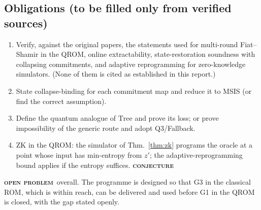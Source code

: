 \documentclass[11pt]{article}
\newcommand{\epitag}[3]{\colorbox{#2}{\textcolor{#1}{\textsc{\footnotesize\bfseries #3}}}}
\newcommand{\conjectureTag}{\epitag{conjyellow}{conjbg}{conjecture}}
\newcommand{\openproblem}{\epitag{openred}{openbg}{open problem}}
\renewcommand{\_}{\textunderscore\allowbreak{}}
\theoremstyle{definition}
\begin{document}
\subsection{Obligations (to be filled only from verified sources)}
\begin{enumerate}[leftmargin=1.6em,label=\textbf{Q\arabic*.}]
\item Verify, against the original papers, the statements used for multi-round Fiat--Shamir in the QROM, online extractability, state-restoration soundness with collapsing commitments, and adaptive reprogramming for zero-knowledge simulators. (None of them is cited as established in this report.)
\item State collapse-binding for each commitment map and reduce it to MSIS (or find the correct assumption).
\item Define the quantum analogue of $\mathrm{Tree}$ and prove its loss; or prove impossibility of the generic route and adopt Q3/Fallback.
\item ZK in the QROM: the simulator of Thm.~\ref{thm:zk} programs the oracle at a point whose input has min-entropy from $z'$; the adaptive-reprogramming bound applies if the entropy suffices. \conjectureTag
\end{enumerate}
\openproblem\ overall. The programme is designed so that G3 in the classical ROM, which is within reach, can be delivered and used before G1 in the QROM is closed, with the gap stated openly.
\end{document}
